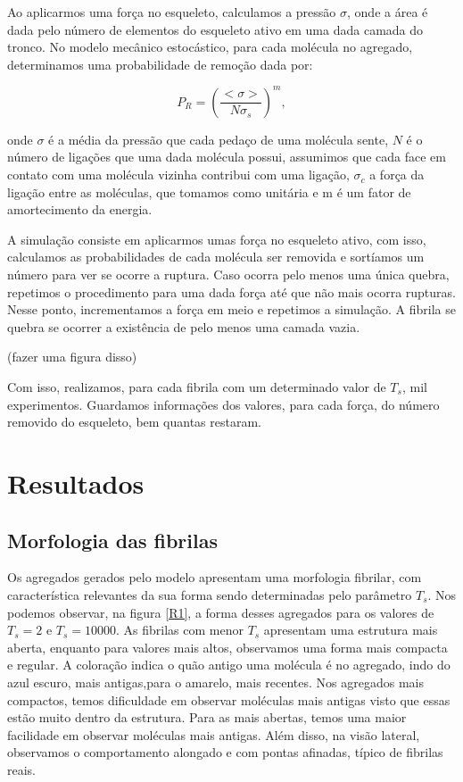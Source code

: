 \documentclass{article}
\begin{document}
Ao aplicarmos uma força no esqueleto, calculamos a pressão $\sigma$, onde a área é dada pelo número de elementos do esqueleto ativo em uma dada camada do tronco. No modelo mecânico estocástico, para cada molécula no agregado, determinamos uma probabilidade de remoção dada por:

\begin{equation}
    P_{R} = (\frac{<\sigma>}{N\sigma_{s}})^{m},
\end{equation}

\noindent onde $\sigma$ é a média da pressão que cada pedaço de uma molécula sente, $N$ é o número de ligações que uma dada molécula possui, assumimos que cada face em contato com uma molécula vizinha contribui com uma ligação, $\sigma_{c}$ a força da ligação entre as moléculas, que tomamos como unitária e m é um fator de amortecimento da energia\cite{Parkinson1997,2013}.

A simulação consiste em aplicarmos umas força no esqueleto ativo, com isso, calculamos as probabilidades de cada molécula ser removida e sortíamos um número para ver se ocorre a ruptura. Caso ocorra pelo menos uma única quebra, repetimos o procedimento para uma dada força até que não mais ocorra rupturas. Nesse ponto, incrementamos a força em meio e repetimos a simulação. A fibrila se quebra se ocorrer a existência de pelo menos uma camada vazia.

(fazer uma figura disso)

Com isso, realizamos, para cada fibrila com um determinado valor de $T_{s}$, mil experimentos. Guardamos informações dos valores, para cada força, do número removido do esqueleto, bem quantas restaram.

\section{Resultados}

\subsection{Morfologia das fibrilas}

Os agregados gerados pelo modelo apresentam uma morfologia fibrilar, com característica relevantes da sua forma sendo determinadas pelo parâmetro $T_{s}$. Nos podemos observar, na figura \ref{R1}, a forma desses agregados para os valores de $T_{s} = 2$ e $T_{s} = 10000$. As fibrilas com menor $T_{s}$ apresentam uma estrutura mais aberta, enquanto para valores mais altos, observamos uma forma mais compacta e regular. A coloração indica o quão antigo uma molécula é no agregado, indo do azul escuro, mais antigas,para o amarelo, mais recentes. Nos agregados mais compactos, temos dificuldade em observar moléculas mais antigas visto que essas estão muito dentro da estrutura. Para as mais abertas, temos uma maior facilidade em observar moléculas mais antigas. Além disso, na visão lateral, observamos o comportamento alongado e com pontas afinadas, típico de fibrilas reais. 
\end{document}
